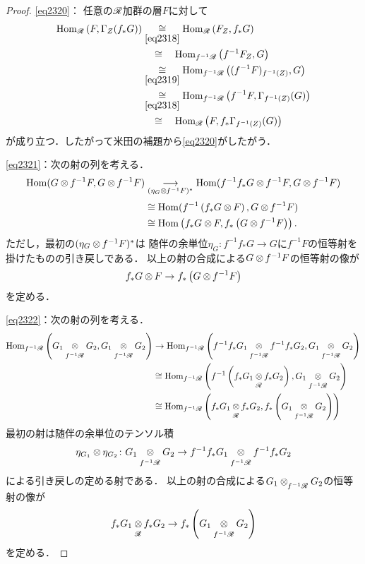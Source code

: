\begin{proof}
    \eqref{eq2320}：
    任意の\(\mathscr{R}\)加群の層\(F\)に対して\begin{align*}
        \Hom_{\scR}\left(F,\Gamma_{Z}(f_{\ast}G)\right)
        &\underset{\eqref{eq2318}}{\cong}
        \Hom_{\scR}\left(F_{Z},f_{\ast}G\right)\\
        &\ \ \ \cong\ \ \ 
        \Hom_{f^{-1}\scR}\left(f^{-1}F_{Z},G\right)\\
        &\underset{\eqref{eq2319}}{\cong}
        \Hom_{f^{-1}\scR}\left((f^{-1}F)_{f^{-1}(Z)},G\right)\\
        &\underset{\eqref{eq2318}}{\cong}
        \Hom_{f^{-1}\scR}\left(f^{-1}F,\Gamma_{f^{-1}(Z)}(G)\right)\\
        &\ \ \ \cong\ \ \ 
        \Hom_{\scR}\left(F,f_{\ast}\Gamma_{f^{-1}(Z)}(G)\right)
    \end{align*}
    が成り立つ．したがって米田の補題から\eqref{eq2320}がしたがう．

    \eqref{eq2321}：次の射の列を考える．
    \begin{align*}
        \Hom(G\tens[]f^{-1}F,G\tens[]f^{-1}F)
        &\underset{(\eta_{G}\tens[]f^{-1}F)^{\ast}}{\longrightarrow}
        \Hom(f^{-1}f_{\ast}G\tens[]f^{-1}F,G\tens[]f^{-1}F)\\
        &\cong
        \Hom(f^{-1}\left(f_{\ast}G\tens[]F\right),G\tens[]f^{-1}F)\\
        &\cong
        \Hom\left(f_{\ast}G\tens[]F,f_{\ast}\left(G\tens[]f^{-1}F\right)\right).
    \end{align*}
    ただし，最初の\((\eta_{G}\tens[]f^{-1}F)^{\ast}\)は
    随伴の余単位\(
        \eta_G\colon f^{-1}f_{\ast}G\to G
    \)に\(f^{-1}F\)の恒等射を掛けたものの引き戻しである．
    以上の射の合成による\(G\tens[]f^{-1}F\)の恒等射の像が\[
        f_{\ast}G\tens[]F\to f_{\ast}\left(G\tens[]f^{-1}F\right)
    \]を定める．

    \eqref{eq2322}：次の射の列を考える．
    \begin{align*}
        \Hom_{f^{-1}\scR}\left(G_1\ttens[f^{-1}\scR]G_2,G_1\ttens[f^{-1}\scR]G_2\right)
        &\to
        \Hom_{f^{-1}\scR}\left(f^{-1}f_{\ast}G_1\ttens[f^{-1}\scR]f^{-1}f_{\ast}G_2,G_1\ttens[f^{-1}\scR]G_2\right)\\
        &\cong
        \Hom_{f^{-1}\scR}\left(f^{-1}\left(f_{\ast}G_1\ttens[\scR]f_{\ast}G_2\right),G_1\ttens[f^{-1}\scR]G_2\right)\\
        &\cong
        \Hom_{f^{-1}\scR}\left(f_{\ast}G_1\ttens[\scR]f_{\ast}G_2,f_{\ast}\left(G_1\ttens[f^{-1}\scR]G_2\right)\right)
    \end{align*}
    最初の射は随伴の余単位のテンソル積\[
        \eta_{G_1}\tens[]\eta_{G_2}\colon 
        G_1\ttens[f^{-1}\scR]G_2
        \to
        f^{-1}f_{\ast}G_1\ttens[f^{-1}\scR]f^{-1}f_{\ast}G_2
    \]による引き戻しの定める射である．
    以上の射の合成による\(G_1\ttens[f^{-1}\scR]G_2\)の恒等射の像が
    \[
        f_{\ast}G_{1}\ttens[\scR]f_{\ast}G_{2}
        \to 
        f_{\ast}\left(G_{1}\ttens[f^{-1}\scR]G_{2}\right)
    \]を定める．


\end{proof}
